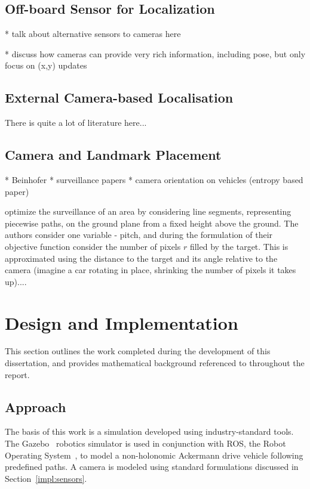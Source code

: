 \documentclass[a4paper,12pt,twoside,openright]{report}
\begin{document}
\section{Off-board Sensor for Localization}
* talk about alternative sensors to cameras here

* discuss how cameras can provide very rich information, including pose, but only focus on (x,y) updates

\section{External Camera-based Localisation}

There is quite a lot of literature here...

\section{Camera and Landmark Placement}

* Beinhofer
* surveillance papers
* camera orientation on vehicles (entropy based paper)

\citeauthor{bodor2007optimal} optimize the surveillance of an area by considering
line segments, representing piecewise paths, on the ground plane from a fixed
height above the ground. The authors consider one variable - pitch,
and during the formulation of their
objective function consider the number of pixels $r$ filled by the target.
This is approximated using the distance to the target and its angle relative 
to the camera (imagine a car rotating in place, shrinking the number
of pixels it takes up).... 

\chapter{Design and Implementation}
\label{chap:impl}

This section outlines the work completed during the development
of this dissertation, and provides mathematical background
referenced to throughout the report.

\section{Approach}

The basis of this work is a simulation developed using industry-standard tools.
The Gazebo~\cite{koenig2004design} robotics simulator is used in conjunction with ROS,
the Robot Operating System~\cite{quigley2009ros}, to model a non-holonomic Ackermann drive vehicle
following predefined paths. A camera is modeled using standard formulations
discussed in Section~\ref{impl:sensors}.
\end{document}
